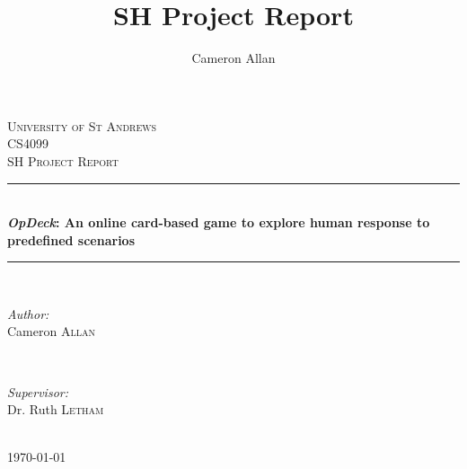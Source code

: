 \documentclass[]{report}
\newcommand{\od}{\textit{OpDeck}}
\begin{document}
\title{SH Project Report}
\author{Cameron Allan}

\begin{titlepage}

  \newcommand{\HRule}{\rule{\linewidth}{0.5mm}}
  \renewcommand{\contentsname}{Table of Contents}

  \center


  \textsc{\LARGE University of St Andrews}\\[1.5cm]
  \textsc{\Large CS4099}\\[0.5cm]
  \textsc{\large SH Project Report}\\[0.5cm]


  \HRule\\[0.4cm]
  { \huge \bfseries \od{}: An online card-based game to explore human response to predefined scenarios}\\[0.4cm] %
  \HRule\\[1.5cm]


  \begin{minipage}{0.4\textwidth}
    \begin{flushleft} \large
      \emph{Author:}\\
      Cameron \textsc{Allan}
    \end{flushleft}
  \end{minipage}
  ~
  \begin{minipage}{0.4\textwidth}
    \begin{flushright} \large
      \emph{Supervisor:} \\
      Dr. Ruth \textsc{Letham}
    \end{flushright}
  \end{minipage}\\[0.5cm]

  {\large \today}\\[0.5cm]


\end{titlepage}
\end{document}
